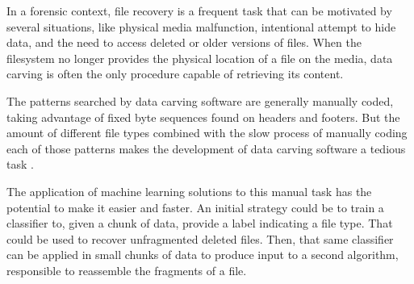     
In a forensic context, file recovery is a frequent task that can be motivated by several situations, like physical media malfunction, intentional attempt to hide data, and the need to access deleted or older versions of files. When the filesystem no longer provides the physical location of a file on the media, data carving is often the only procedure capable of retrieving its content.


The patterns searched by data carving software are generally manually coded, taking advantage of fixed byte sequences found on headers and footers. But the amount of different file types combined with the slow process of manually coding each of those patterns makes the development of data carving software a tedious task \cite{mcdaniel_content_2003}.

The application of machine learning solutions to this manual task has the potential to make it easier and faster. An initial strategy could be to train a classifier to, given a chunk of data, provide a label indicating a file type. That could be used to recover unfragmented deleted files.
Then, that same classifier can be applied in small chunks of data to produce input to a second algorithm, responsible to reassemble the fragments of a file.
